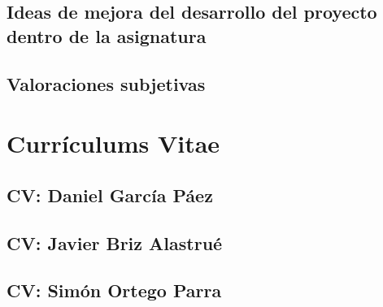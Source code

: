 \documentclass[10pt,spanish]{article}
\let\stdsection\section
\renewcommand\section{\newpage\stdsection}
\begin{document}


\subsection{Ideas de mejora del desarrollo del proyecto dentro de la asignatura}


\subsection{Valoraciones subjetivas}


\appendix


\section{Currículums Vitae}\label{sec:cvs}

\subsection{CV: Daniel García Páez}

\newpage

\subsection{CV: Javier Briz Alastrué}

\newpage

\subsection{CV: Simón Ortego Parra}

\newpage
\end{document}
